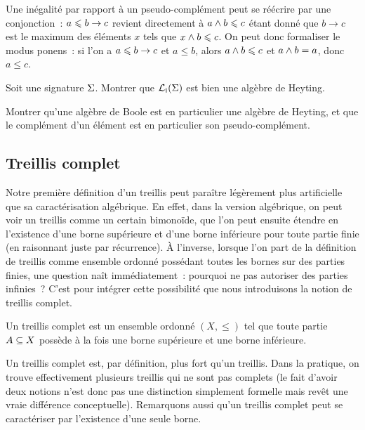 \begin{remark}
  Une inégalité par rapport à un pseudo-complément peut se réécrire par une
  conjonction~: $a\leqslant b \to c$ revient directement à $a\wedge b \leqslant c$ étant
  donné que $b \to c$ est le maximum des éléments $x$ tels que
  $x\wedge b \leqslant c$. On peut donc formaliser le modus ponens~: si l'on a
  $a\leqslant b \to c$ et $a\leq b$, alors $a\wedge b \leqslant c$ et $a\wedge b = a$,
  donc $a\leq c$.
\end{remark}

\begin{exercise}
  Soit une signature $\Sigma$. Montrer que $\mathcal{L}_{\mathrm{i}}(\Sigma)$ est
  bien une algèbre de Heyting.
\end{exercise}

\begin{exercise}
  Montrer qu'une algèbre de Boole est en particulier une algèbre de Heyting, et
  que le complément d'un élément est en particulier son pseudo-complément.
\end{exercise}

\subsection{Treillis complet}

Notre première définition d'un treillis peut paraître légèrement plus
artificielle que sa caractérisation algébrique. En effet, dans la version
algébrique, on peut voir un treillis comme un certain bimonoïde, que l'on peut
ensuite étendre en l'existence d'une borne supérieure et d'une borne inférieure
pour toute partie finie (en raisonnant juste par récurrence). \`A l'inverse,
lorsque l'on part de la définition de treillis comme ensemble ordonné possédant
toutes les bornes sur des parties finies, une question naît immédiatement~:
pourquoi ne pas autoriser des parties infinies~? C'est pour intégrer cette
possibilité que nous introduisons la notion de treillis complet.

\begin{definition}
  Un treillis complet est un ensemble ordonné $(X,\leq)$ tel que toute partie
  $A\subseteq X$ possède à la fois une borne supérieure et une borne
  inférieure.
\end{definition}

Un treillis complet est, par définition, plus fort qu'un treillis. Dans la
pratique, on trouve effectivement plusieurs treillis qui ne sont pas complets
(le fait d'avoir deux notions n'est donc pas une distinction simplement formelle
mais revêt une vraie différence conceptuelle). Remarquons aussi qu'un treillis
complet peut se caractériser par l'existence d'une seule borne.

